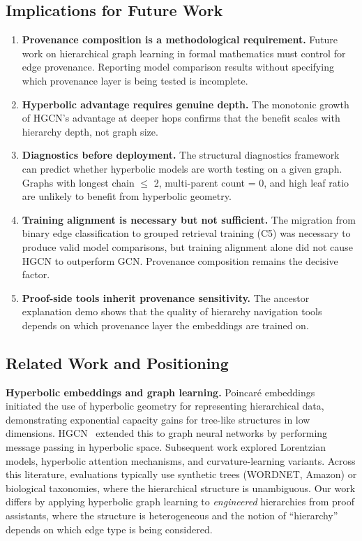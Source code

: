 \documentclass[runningheads]{llncs}
\newcommand{\enquote}[1]{``#1''}
\begin{document}
\subsection{Implications for Future Work}

\begin{enumerate}
\item \textbf{Provenance composition is a methodological requirement.} Future work on hierarchical graph learning in formal mathematics must control for edge provenance. Reporting model comparison results without specifying which provenance layer is being tested is incomplete.
\item \textbf{Hyperbolic advantage requires genuine depth.} The monotonic growth of HGCN's advantage at deeper hops confirms that the benefit scales with hierarchy depth, not graph size.
\item \textbf{Diagnostics before deployment.} The structural diagnostics framework can predict whether hyperbolic models are worth testing on a given graph. Graphs with longest chain $\leq$ 2, multi-parent count = 0, and high leaf ratio are unlikely to benefit from hyperbolic geometry.
\item \textbf{Training alignment is necessary but not sufficient.} The migration from binary edge classification to grouped retrieval training (C5) was necessary to produce valid model comparisons, but training alignment alone did not cause HGCN to outperform GCN. Provenance composition remains the decisive factor.
\item \textbf{Proof-side tools inherit provenance sensitivity.} The ancestor explanation demo shows that the quality of hierarchy navigation tools depends on which provenance layer the embeddings are trained on.
\end{enumerate}

\subsection{Related Work and Positioning}

\textbf{Hyperbolic embeddings and graph learning.}
Poincar\'{e} embeddings~\cite{nickel2017poincare} initiated the use of hyperbolic geometry for representing hierarchical data, demonstrating exponential capacity gains for tree-like structures in low dimensions. HGCN~\cite{liu2019hgcn} extended this to graph neural networks by performing message passing in hyperbolic space. Subsequent work explored Lorentzian models, hyperbolic attention mechanisms, and curvature-learning variants. Across this literature, evaluations typically use synthetic trees (WORDNET, Amazon) or biological taxonomies, where the hierarchical structure is unambiguous. Our work differs by applying hyperbolic graph learning to \emph{engineered} hierarchies from proof assistants, where the structure is heterogeneous and the notion of \enquote{hierarchy} depends on which edge type is being considered.
\end{document}
